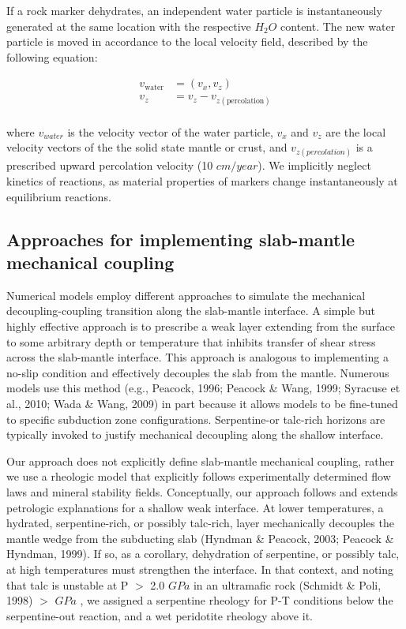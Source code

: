 \documentclass[draft,linenumbers]{agujournal2018}
\begin{document}
If a rock marker dehydrates, an independent water particle is
instantaneously generated at the same location with the respective
\(H_{2}O\) content. The new water particle is moved in accordance to the
local velocity field, described by the following equation:

\[\begin{aligned}
v_{\text{water}} & = (v_{x},v_{z}) \\
v_{z} & = v_{z} - v_{z(\text{percolation})} \\
\end{aligned}\]

where \(v_{water}\) is the velocity vector of the water particle,
\(v_{x}\) and \(v_{z}\) are the local velocity vectors of the the solid
state mantle or crust, and \(v_{z(percolation)}\) is a prescribed upward
percolation velocity (10 \(cm/year\)). We implicitly neglect kinetics of
reactions, as material properties of markers change instantaneously at
equilibrium reactions.

\subsection{Approaches for implementing slab-mantle mechanical coupling}

Numerical models employ different approaches to simulate the mechanical
decoupling-coupling transition along the slab-mantle interface. A simple
but highly effective approach is to prescribe a weak layer extending
from the surface to some arbitrary depth or temperature that inhibits
transfer of shear stress across the slab-mantle interface. This approach
is analogous to implementing a no-slip condition and effectively
decouples the slab from the mantle. Numerous models use this method
(e.g., Peacock, 1996; Peacock \& Wang, 1999; Syracuse et al., 2010; Wada
\& Wang, 2009) in part because it allows models to be fine-tuned to
specific subduction zone configurations. Serpentine-or talc-rich
horizons are typically invoked to justify mechanical decoupling along
the shallow interface.

Our approach does not explicitly define slab-mantle mechanical coupling,
rather we use a rheologic model that explicitly follows experimentally
determined flow laws and mineral stability fields. Conceptually, our
approach follows and extends petrologic explanations for a shallow weak
interface. At lower temperatures, a hydrated, serpentine-rich, or
possibly talc-rich, layer mechanically decouples the mantle wedge from
the subducting slab (Hyndman \& Peacock, 2003; Peacock \& Hyndman,
1999). If so, as a corollary, dehydration of serpentine, or possibly
talc, at high temperatures must strengthen the interface. In that
context, and noting that talc is unstable at P \(>\) 2.0 \(GPa\) in an
ultramafic rock (Schmidt \& Poli, 1998) \(>\) \(GPa\) , we assigned a
serpentine rheology for P-T conditions below the serpentine-out
reaction, and a wet peridotite rheology above it.
\end{document}
